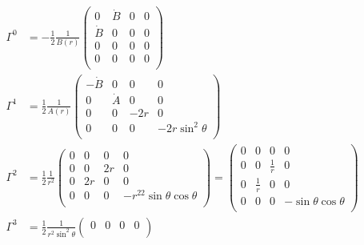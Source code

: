 \begin{subequations}
    \begin{align}
        \Gamma^0 & =
        -\frac{1}{2} \frac{1}{B(r)}
        \begin{pmatrix}
            0       & \dot{B} & 0 & 0 \\
            \dot{B} & 0       & 0 & 0 \\
            0       & 0       & 0 & 0 \\
            0       & 0       & 0 & 0 \\
        \end{pmatrix} \\
        \Gamma^1 & =
        \frac{1}{2} \frac{1}{A(r)}
        \begin{pmatrix}
            -\dot{B} & 0       & 0   & 0               \\
            0        & \dot{A} & 0   & 0               \\
            0        & 0       & -2r & 0               \\
            0        & 0       & 0   & -2r\sin^2\theta \\
        \end{pmatrix} \\
        \Gamma^2 & =
        \frac{1}{2} \frac{1}{r^2}
        \begin{pmatrix}
            0 & 0  & 0  & 0                         \\
            0 & 0  & 2r & 0                         \\
            0 & 2r & 0  & 0                         \\
            0 & 0  & 0  & -r^22\sin\theta\cos\theta \\
        \end{pmatrix} =
        \begin{pmatrix}
            0 & 0           & 0           & 0                     \\
            0 & 0           & \frac{1}{r} & 0                     \\
            0 & \frac{1}{r} & 0           & 0                     \\
            0 & 0           & 0           & -\sin\theta\cos\theta \\
        \end{pmatrix} \\
        \Gamma^3 & =
        \frac{1}{2} \frac{1}{r^2\sin^2\theta}
        \begin{pmatrix}
            0 & 0              & 0                        & 0                        \\

\end{pmatrix}
\end{align}
\end{subequations}
